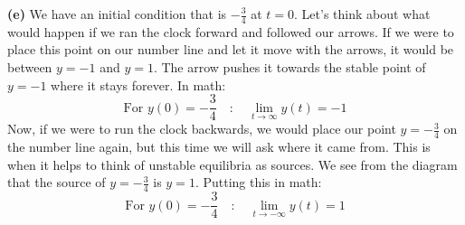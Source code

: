 \documentclass[a4paper,12pt]{article} %
\begin{document}
\textbf{(e)} We have an initial condition that is $-\frac{3}{4}$ at $t=0$. Let's think about what would happen if we ran the clock forward and followed our arrows. If we were to place this point on our number line and let it move with the arrows, it would be between $y=-1$ and $y=1$. The arrow pushes it towards the stable point of $y=-1$ where it stays forever. In math:
$$ \boxed{\text{For $y(0)=-\frac{3}{4}$}\quad :\quad \lim_{t\to \infty} y(t) = -1} $$
Now, if we were to run the clock backwards, we would place our point $y=-\frac{3}{4}$ on the number line again, but this time we will ask where it came from. This is when it helps to think of unstable equilibria as sources. We see from the diagram that the source of $y=-\frac{3}{4}$ is $y=1$. Putting this in math:
$$ \boxed{\text{For $y(0)=-\frac{3}{4}$}\quad:\quad \lim_{t\to -\infty} y(t) = 1} $$
\end{document}
